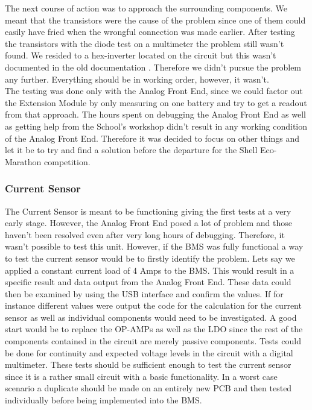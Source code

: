 The next course of action was to approach the surrounding components. We meant that the transistors were the cause of the problem since one of them could easily have fried when the wrongful connection was made earlier. After testing the transistors with the diode test on a multimeter the problem still wasn't found. We resided to a hex-inverter located on the circuit but this wasn't documented in the old documentation . Therefore we didn't pursue the problem any further. Everything should be in working order, however, it wasn't.\\
The testing was done only with the Analog Front End, since we could factor out the Extension Module by only measuring on one battery and try to get a readout from that approach. The hours spent on debugging the Analog Front End as well as getting help from the School's workshop didn't result in any working condition of the Analog Front End. Therefore it was decided to focus on other things and let it be to try and find a solution before the departure for the Shell Eco-Marathon competition.

\subsubsection{Current Sensor}
The Current Sensor is meant to be functioning giving the first tests at a very early stage. However, the Analog Front End posed a lot of problem and those haven't been resolved even after very long hours of debugging. Therefore, it wasn't possible to test this unit. However, if the BMS was fully functional a way to test the current sensor would be to firstly identify the problem. Lets say we applied a constant current load of 4 Amps to the BMS. This would result in a specific result and data output from the Analog Front End. These data could then be examined by using the USB interface and confirm the values. If for instance different values were output the code for the calculation for the current sensor as well as individual components would need to be investigated. A good start would be to replace the OP-AMPs as well as the LDO since the rest of the components contained in the circuit  are merely passive components. Tests could be done for continuity and expected voltage levels in the circuit with a digital multimeter. These tests should be sufficient enough to test the current sensor since it is a rather small circuit with a basic functionality. In a worst case scenario a duplicate should be made on an entirely new PCB and then tested individually before being implemented into the BMS.    


